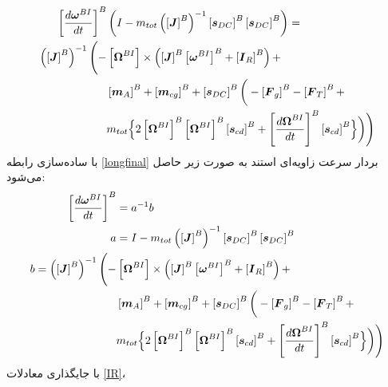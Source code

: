 \begin{equation}\label{longfinal}
	\begin{split}
		\left[\dfrac{d\boldsymbol\omega^{BI}}{dt}\right]^B  & \left(
		I - m_{tot} \left(\left[\boldsymbol J\right]^B\right)^{-1}
		\left[\boldsymbol s_{DC}\right]^B
		\left[\boldsymbol s_{DC}\right]^B\right) = \\
		\left(\left[\boldsymbol J\right]^B\right)^{-1}\Bigg(
		-&\left[\boldsymbol\Omega^{BI}\right]\times\left(
		\left[\boldsymbol J\right]^B\left[\boldsymbol\omega^{BI}\right]^B
		+\left[\boldsymbol I_R\right]^B\right) + \\
		&\left[\boldsymbol m_A\right]^B + \left[\boldsymbol m_{cg}\right]^B+\left[\boldsymbol s_{DC}\right]^B
		\bigg(-\left[\boldsymbol F_g\right]^B
		-\left[\boldsymbol F_T\right]^B+ \\
		&m_{tot}\Bigl\{2
		\left[\boldsymbol\Omega^{BI}\right]^B
		\left[\boldsymbol\Omega^{BI}\right]^B
		\left[\boldsymbol s_{cd}\right]^B+
		\left[\dfrac{d\boldsymbol\Omega^{BI}}{dt}\right]^B
		\left[\boldsymbol s_{cd}\right]^B
		\Bigr\}\bigg)\Bigg)		
	\end{split}
\end{equation}
با ساده‌سازی رابطه \ref{longfinal}  بردار سرعت زاویه‌ای استند به صورت زیر حاصل می‌شود:
\begin{equation}\label{finaltorquefinal}
	\begin{split}
		\left[\dfrac{d\boldsymbol\omega^{BI}}{dt}\right]^B &= a^{-1}b\\
		a &= I - m_{tot}\left(\left[\boldsymbol J\right]^B\right)^{-1}
		\left[\boldsymbol s_{DC}\right]^B
		\left[\boldsymbol s_{DC}\right]^B\\
		b = \left(\left[\boldsymbol J\right]^B\right)^{-1}\Bigg(
		-&\left[\boldsymbol\Omega^{BI}\right]\times\left(
		\left[\boldsymbol J\right]^B\left[\boldsymbol\omega^{BI}\right]^B
		+\left[\boldsymbol I_R\right]^B\right) + \\
		&\left[\boldsymbol m_A\right]^B+ \left[\boldsymbol m_{cg}\right]^B +\left[\boldsymbol s_{DC}\right]^B
		\bigg(-\left[\boldsymbol F_g\right]^B
		-\left[\boldsymbol F_T\right]^B+ \\
		&m_{tot}\Bigl\{2
		\left[\boldsymbol\Omega^{BI}\right]^B
		\left[\boldsymbol\Omega^{BI}\right]^B
		\left[\boldsymbol s_{cd}\right]^B+
		\left[\dfrac{d\boldsymbol\Omega^{BI}}{dt}\right]^B
		\left[\boldsymbol s_{cd}\right]^B
		\Bigr\}\bigg)\Bigg)		
	\end{split}
\end{equation}
با جایگذاری معادلات
 \ref{IR}،
